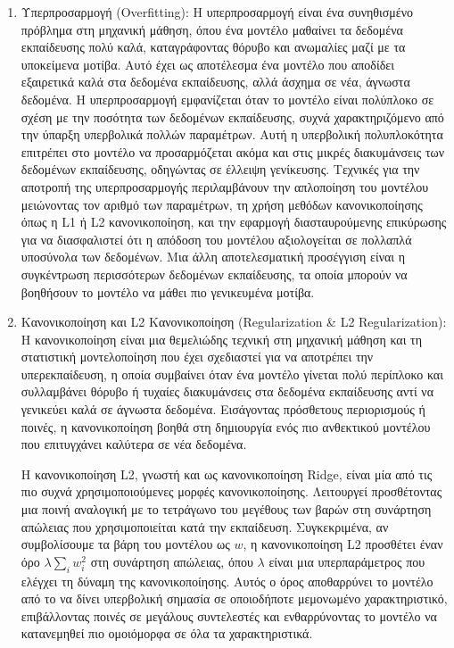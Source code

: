 \begin{enumerate}
    \item Υπερπροσαρμογή (Overfitting): Η υπερπροσαρμογή είναι ένα συνηθισμένο πρόβλημα στη μηχανική μάθηση, όπου ένα μοντέλο μαθαίνει τα δεδομένα εκπαίδευσης πολύ καλά, καταγράφοντας θόρυβο και ανωμαλίες μαζί με τα υποκείμενα μοτίβα. Αυτό έχει ως αποτέλεσμα ένα μοντέλο που αποδίδει εξαιρετικά καλά στα δεδομένα εκπαίδευσης, αλλά άσχημα σε νέα, άγνωστα δεδομένα. Η υπερπροσαρμογή εμφανίζεται όταν το μοντέλο είναι πολύπλοκο σε σχέση με την ποσότητα των δεδομένων εκπαίδευσης, συχνά χαρακτηριζόμενο από την ύπαρξη υπερβολικά πολλών παραμέτρων. Αυτή η υπερβολική πολυπλοκότητα επιτρέπει στο μοντέλο να προσαρμόζεται ακόμα και στις μικρές διακυμάνσεις των δεδομένων εκπαίδευσης, οδηγώντας σε έλλειψη γενίκευσης. Τεχνικές για την αποτροπή της υπερπροσαρμογής περιλαμβάνουν την απλοποίηση του μοντέλου μειώνοντας τον αριθμό των παραμέτρων, τη χρήση μεθόδων κανονικοποίησης όπως η L1 ή L2 κανονικοποίηση, και την εφαρμογή διασταυρούμενης επικύρωσης για να διασφαλιστεί ότι η απόδοση του μοντέλου αξιολογείται σε πολλαπλά υποσύνολα των δεδομένων. Μια άλλη αποτελεσματική προσέγγιση είναι η συγκέντρωση περισσότερων δεδομένων εκπαίδευσης, τα οποία μπορούν να βοηθήσουν το μοντέλο να μάθει πιο γενικευμένα μοτίβα. 

    \item Κανονικοποίηση και L2 Κανονικοποίηση (Regularization \& L2 Regularization): Η κανονικοποίηση είναι μια θεμελιώδης τεχνική στη μηχανική μάθηση και τη στατιστική μοντελοποίηση που έχει σχεδιαστεί για να αποτρέπει την υπερεκπαίδευση, η οποία συμβαίνει όταν ένα μοντέλο γίνεται πολύ περίπλοκο και συλλαμβάνει θόρυβο ή τυχαίες διακυμάνσεις στα δεδομένα εκπαίδευσης αντί να γενικεύει καλά σε άγνωστα δεδομένα. Εισάγοντας πρόσθετους περιορισμούς ή ποινές, η κανονικοποίηση βοηθά στη δημιουργία ενός πιο ανθεκτικού μοντέλου που επιτυγχάνει καλύτερα σε νέα δεδομένα. 

    Η κανονικοποίηση L2, γνωστή και ως κανονικοποίηση Ridge, είναι μία από τις πιο συχνά χρησιμοποιούμενες μορφές κανονικοποίησης. Λειτουργεί προσθέτοντας μια ποινή αναλογική με το τετράγωνο του μεγέθους των βαρών στη συνάρτηση απώλειας που χρησιμοποιείται κατά την εκπαίδευση. Συγκεκριμένα, αν συμβολίσουμε τα βάρη του μοντέλου ως \( w \), η κανονικοποίηση L2 προσθέτει έναν όρο \(\lambda \sum_{i} w_i^2\) στη συνάρτηση απώλειας, όπου \(\lambda\) είναι μια υπερπαράμετρος που ελέγχει τη δύναμη της κανονικοποίησης. Αυτός ο όρος αποθαρρύνει το μοντέλο από το να δίνει υπερβολική σημασία σε οποιοδήποτε μεμονωμένο χαρακτηριστικό, επιβάλλοντας ποινές σε μεγάλους συντελεστές και ενθαρρύνοντας το μοντέλο να κατανεμηθεί πιο ομοιόμορφα σε όλα τα χαρακτηριστικά.
    

\end{enumerate}
